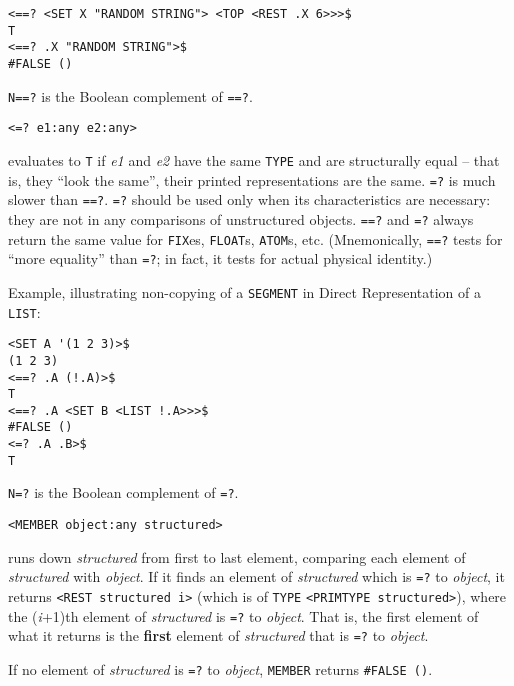 \documentclass[a4paper,]{article}
\begin{document}
\begin{verbatim}
<==? <SET X "RANDOM STRING"> <TOP <REST .X 6>>>$
T
<==? .X "RANDOM STRING">$
#FALSE ()
\end{verbatim}

\texttt{N==?} is the Boolean complement of \texttt{==?}.

\begin{verbatim}
<=? e1:any e2:any>
\end{verbatim}

 evaluates to \texttt{T} if \emph{e1} and \emph{e2} have the same \texttt{TYPE} and are
structurally equal -- that is, they ``look the same'', their printed representations are the same. \texttt{=?} is much
slower than \texttt{==?}. \texttt{=?} should be used only when its characteristics are necessary: they are not in any
comparisons of unstructured objects. \texttt{==?} and \texttt{=?} always return the same value for \texttt{FIX}es,
\texttt{FLOAT}s, \texttt{ATOM}s, etc. (Mnemonically, \texttt{==?} tests for ``more equality'' than \texttt{=?}; in fact, it
tests for actual physical identity.)

Example, illustrating non-copying of a \texttt{SEGMENT} in Direct Representation of a
\texttt{LIST}:

\begin{verbatim}
<SET A '(1 2 3)>$
(1 2 3)
<==? .A (!.A)>$
T
<==? .A <SET B <LIST !.A>>>$
#FALSE ()
<=? .A .B>$
T
\end{verbatim}

\texttt{N=?} is the Boolean complement of \texttt{=?}.

\begin{verbatim}
<MEMBER object:any structured>
\end{verbatim}

 runs down \emph{structured} from first to last element, comparing each element of
\emph{structured} with \emph{object}. If it finds an element of \emph{structured} which is \texttt{=?} to \emph{object}, it
returns \texttt{\textless{}REST\ structured\ i\textgreater{}} (which is of \texttt{TYPE}
\texttt{\textless{}PRIMTYPE\ structured\textgreater{}}), where the (\emph{i}+1)th element of \emph{structured} is
\texttt{=?} to \emph{object}. That is, the first element of what it returns is the \textbf{first} element of
\emph{structured} that is \texttt{=?} to \emph{object}.

If no element of \emph{structured} is \texttt{=?} to \emph{object}, \texttt{MEMBER} returns \texttt{\#FALSE\ ()}.
\end{document}
